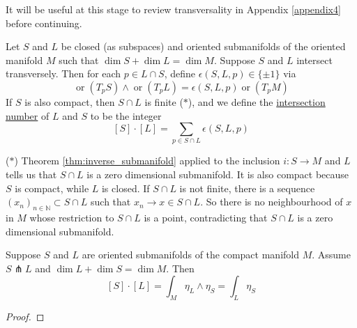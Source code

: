 It will be useful at this stage to review transversality in Appendix
\ref{appendix4} before continuing. 
\begin{defn} %
	Let $S$ and  $L$ be closed (as subspaces) and oriented submanifolds of the
	oriented manifold  $M$ such that  $\dim S + \dim L = \dim M$. Suppose 
	 $S$ and  $L$ intersect transversely. Then for each  $p\in L\cap S$, define
	 $\epsilon(S,L,p) \in \{\pm 1\}$ via
	 \[
		 \operatorname{or}(T_pS) \wedge \operatorname{or}(T_pL)
		 = \epsilon(S,L,p) \operatorname{or}(T_p M)
	 \] 
	 If $S$ is also compact, then  $S\cap L$ is finite ($\ast$), and we define the
	 \underline{intersection number} of  $L$ and  $S$ to be the integer
	  \[
		  [S]\cdot [L] = \sum_{p\in S\cap L} \epsilon(S,L,p)
	 \] 
\end{defn}
\noindent
($\ast$) Theorem \ref{thm:inverse_submanifold} applied to
the inclusion $i: S \to M$ and  $L$ tells us that  $S\cap L$ is a zero
dimensional submanifold. It is also compact because $S$ is compact, while  $L$
is closed. If $S\cap L$ is not finite, there is a sequence  
$(x_n)_{n\in \mathbb{N}} \subset S\cap L$ such that $x_n \to x \in S\cap L$. So 
there is no neighbourhood of $x$ in $M$ whose restriction to $S\cap L$ is a
point, contradicting that $S\cap L$ is a zero dimensional submanifold. 

\begin{thm} \label{thm:intersection_poincare} %
	Suppose $S$ and  $L$ are oriented submanifolds of the compact manifold  $M$.
	Assume  $S \pitchfork L$ and  $\dim L + \dim S = \dim M$.
	Then 
	\[ %
		[S] \cdot [L] = \int_M \eta_L \wedge \eta_S = \int_L \eta_S
	\] 
\end{thm}
\begin{proof}
\end{proof}

